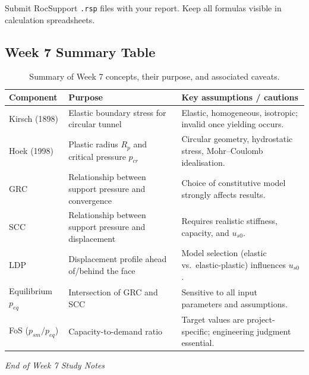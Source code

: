 \documentclass[a4paper,12pt]{article}
\begin{document}
\begin{notebox}
Submit RocSupport \texttt{.rsp} files with your report. Keep all formulas visible in calculation spreadsheets.
\end{notebox}

\subsection{Week 7 Summary Table}
\begin{table}[h!]
\centering
\begin{tabularx}{\textwidth}{l X X}
\toprule
\textbf{Component} & \textbf{Purpose} & \textbf{Key assumptions / cautions} \\
\midrule
Kirsch (1898) & Elastic boundary stress for circular tunnel & Elastic, homogeneous, isotropic; invalid once yielding occurs. \\
Hoek (1998) & Plastic radius $R_p$ and critical pressure $p_{cr}$ & Circular geometry, hydrostatic stress, Mohr--Coulomb idealisation. \\
GRC & Relationship between support pressure and convergence & Choice of constitutive model strongly affects results. \\
SCC & Relationship between support pressure and displacement & Requires realistic stiffness, capacity, and $u_{s0}$. \\
LDP & Displacement profile ahead of/behind the face & Model selection (elastic vs.\ elastic-plastic) influences $u_{s0}$. \\
Equilibrium $p_{eq}$ & Intersection of GRC and SCC & Sensitive to all input parameters and assumptions. \\
FoS ($p_{sm}/p_{eq}$) & Capacity-to-demand ratio & Target values are project-specific; engineering judgment essential. \\
\bottomrule
\end{tabularx}
\caption{Summary of Week 7 concepts, their purpose, and associated caveats.}
\end{table}

\vspace{1cm}
\noindent\textit{End of Week 7 Study Notes}
\end{document}
